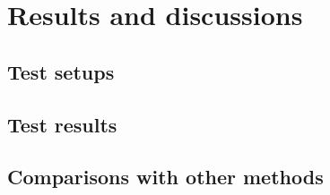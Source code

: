 \section{Results and discussions}

\subsection{Test setups}

\subsection{Test results}

\subsection{Comparisons with other methods}